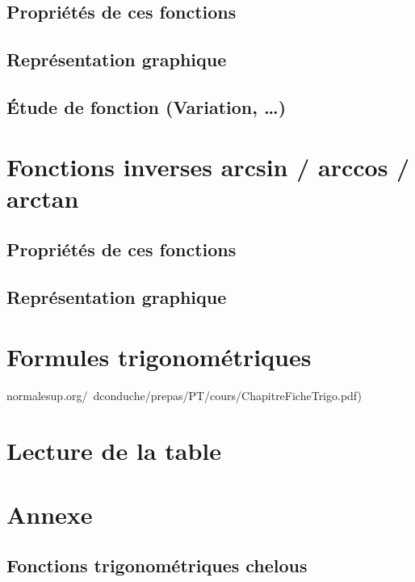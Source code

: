 \documentclass[a4paper]{article}
\begin{document}
		\subsection{Propriétés de ces fonctions}

		\subsection{Représentation graphique}

		\subsection{Étude de fonction (Variation, …)}

	\section{Fonctions inverses arcsin / arccos / arctan}

		\subsection{Propriétés de ces fonctions}

		\subsection{Représentation graphique}

	\section{Formules trigonométriques}

		normalesup.org/~dconduche/prepas/PT/cours/ChapitreFicheTrigo.pdf)

	\section{Lecture de la table}

	\section{Annexe}

		\subsection*{Fonctions trigonométriques chelous} \label{fonction_trigo_chelous}
\end{document}
